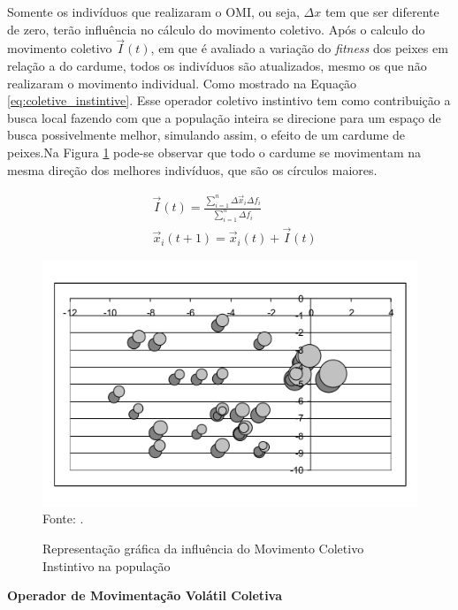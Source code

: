 Somente os indivíduos que realizaram o OMI, ou seja, $\Delta x$ tem que ser diferente de zero, terão influência no cálculo do movimento coletivo. Após o calculo do movimento coletivo $\vec{I}(t)$, em que é avaliado a variação do \textit{fitness} dos peixes em relação a do cardume, todos os indivíduos são atualizados, mesmo os que não realizaram o movimento individual. Como mostrado na Equação \ref{eq:coletive_instintive}. Esse operador coletivo instintivo tem como contribuição a busca local fazendo com que a população inteira se direcione para um espaço de busca possivelmente melhor, simulando assim, o efeito de um cardume de peixes.Na Figura \ref{fig:coletive_moviment} pode-se observar que todo o cardume se movimentam na mesma direção dos melhores indivíduos, que são os círculos maiores.

\begin{equation}
\label{eq:coletive_instintive}
\begin{split}
& \vec{I}(t) = \frac{\sum_{i=1}^{n} \Delta \vec{x}_i \Delta f_i}{\sum_{i=1}^{n} \Delta f_i} \\
& \vec{x}_i (t+1) = \vec{x}_i (t) + \vec{I}(t)
\end{split}
\end{equation}

\begin{figure}[!htb]
	\caption{Representação gráfica da influência do Movimento Coletivo Instintivo na população}
	\centering
	\includegraphics[scale=0.5]{images/movimento_coletivo.png}
	\label{fig:coletive_moviment}{\\Fonte: .}
\end{figure}

\noindent \textbf{Operador de Movimentação Volátil Coletiva}

